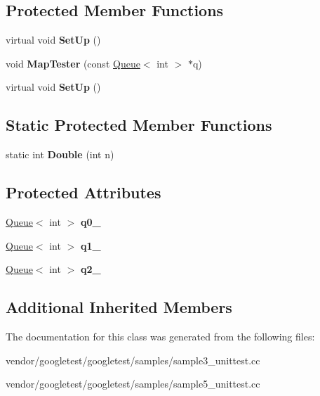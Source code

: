 \subsection*{Protected Member Functions}
\begin{DoxyCompactItemize}
\item 
\mbox{\label{class_queue_test_a91e69958f086239a523864d6b94ab174}} 
virtual void {\bfseries Set\+Up} ()
\item 
\mbox{\label{class_queue_test_a7f1661cd16c428a130d6ac1e4246eaab}} 
void {\bfseries Map\+Tester} (const \hyperlink{class_queue}{Queue}$<$ int $>$ $\ast$q)
\item 
\mbox{\label{class_queue_test_a91e69958f086239a523864d6b94ab174}} 
virtual void {\bfseries Set\+Up} ()
\end{DoxyCompactItemize}
\subsection*{Static Protected Member Functions}
\begin{DoxyCompactItemize}
\item 
\mbox{\label{class_queue_test_a2c7e0d1edb558dbbc4c085316d3d1ee6}} 
static int {\bfseries Double} (int n)
\end{DoxyCompactItemize}
\subsection*{Protected Attributes}
\begin{DoxyCompactItemize}
\item 
\mbox{\label{class_queue_test_a0eba1fe2b31d75abd2df688ca5245e22}} 
\hyperlink{class_queue}{Queue}$<$ int $>$ {\bfseries q0\+\_\+}
\item 
\mbox{\label{class_queue_test_a1e55594e71820ba0f1b09591fb328c30}} 
\hyperlink{class_queue}{Queue}$<$ int $>$ {\bfseries q1\+\_\+}
\item 
\mbox{\label{class_queue_test_aeb7a2e3f6ce2d97d84eb1e01468adc2f}} 
\hyperlink{class_queue}{Queue}$<$ int $>$ {\bfseries q2\+\_\+}
\end{DoxyCompactItemize}
\subsection*{Additional Inherited Members}


The documentation for this class was generated from the following files\+:\begin{DoxyCompactItemize}
\item 
vendor/googletest/googletest/samples/sample3\+\_\+unittest.\+cc\item 
vendor/googletest/googletest/samples/sample5\+\_\+unittest.\+cc\end{DoxyCompactItemize}
